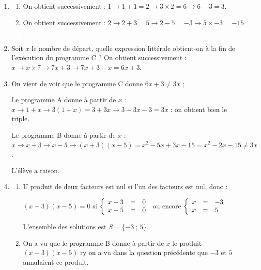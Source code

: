 \begin{enumerate}
	\item \begin{enumerate}
		\item %
On obtient successivement : $1 \to 1 + 1 = 2 \to 3 \times 2  = 6 \to 6 - 3 = 3$.	
		\item %
On obtient successivement : $2 \to 2 + 3 = 5 \to 2 - 5 = - 3 \to 5 \times - 3 = - 15$.
	\end{enumerate}
	\item Soit $x$ le nombre de départ, quelle expression littérale obtient-on à la fin de l'exécution du programme C ?
On obtient successivement : $x \to x \times 7 \to 7x + 3 \to 7x + 3 - x = 6x + 3$.	
	\item %
On vient de voir que le programme C donne $6x + 3 \ne 3x$ ;

Le programme A donne à partir de $x$ : $x \to 1 + x \to 3(1 + x) = 3 + 3x \to 3 + 3x -3 = 3x$ : on 
obtient bien le triple.

Le programme B donne à partir de $x$ : $x \to x + 3 \to x - 5 \to (x + 3)(x - 5) = x^2 - 5x + 3x - 15 = x^2 - 2x - 15 \ne 3x$.

L'élève a raison.
	\item \begin{enumerate}
		\item %
U produit de deux facteurs est nul si l'un des facteurs est nul, donc :

$(x + 3)(x - 5) = 0$ si $\left\{\begin{array}{l c l}
x + 3&=&0\\
x - 5&=&0
\end{array}\right.$ ou encore $\left\{\begin{array}{l c l}
x &=&- 3\\
x &=&5
\end{array}\right.$

L'ensemble des solutions est $S = \{- 3~;~5\}$.

		\item %
On a vu que le programme B donne à partir de $x$ le produit $(x + 3)(x - 5)$ ry on a vu dans la question précédente que $- 3$ et $5$ annulaient ce produit.


\end{enumerate}
\end{enumerate}

